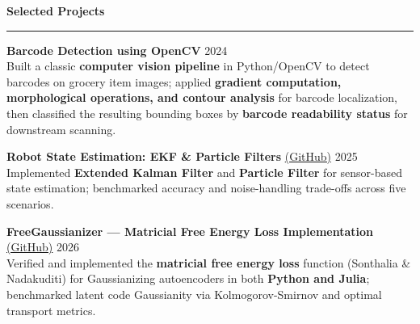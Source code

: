 \documentclass[9pt]{article}
\newcommand{\sect}[1]{\vspace{4pt}\noindent\textbf{\large #1}\vspace{3pt}\hrule\vspace{6pt}}
\begin{document}
\sect{Selected Projects}

\textbf{Barcode Detection using OpenCV} \hfill 2024\\
Built a classic \textbf{computer vision pipeline} in Python/OpenCV to detect barcodes on grocery item images; applied \textbf{gradient computation, morphological operations, and contour analysis} for barcode localization, then classified the resulting bounding boxes by \textbf{barcode readability status} for downstream scanning.

\textbf{Robot State Estimation: EKF \& Particle Filters} \href{https://github.com/Thiruloksundar/robot_state_estimation}{(GitHub)} \hfill 2025\\
Implemented \textbf{Extended Kalman Filter} and \textbf{Particle Filter} for sensor-based state estimation; benchmarked accuracy and noise-handling trade-offs across five scenarios.

\textbf{FreeGaussianizer --- Matricial Free Energy Loss Implementation} \href{https://github.com/Thiruloksundar/FreeGaussianizer.jl}{(GitHub)} \hfill 2026\\
Verified and implemented the \textbf{matricial free energy loss} function (Sonthalia \& Nadakuditi) for Gaussianizing autoencoders in both \textbf{Python and Julia}; benchmarked latent code Gaussianity via Kolmogorov-Smirnov and optimal transport metrics.
\end{document}
